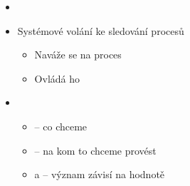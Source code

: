 
\begin{frame}{}

  \begin{itemize}
    \item {}
    \item Systémové volání ke sledování procesů
    \begin{itemize}
      \item Naváže se na proces
      \item Ovládá ho
    \end{itemize}

    \pause

    \item {}\\
    \begin{itemize}
      \item {} -- co chceme
      \item {} -- na kom to chceme provést
      \item {} a  -- význam závisí na hodnotě 
    \end{itemize}
  \end{itemize}

\end{frame}

